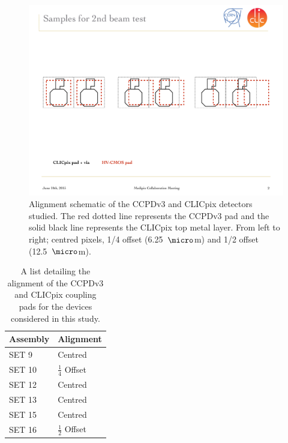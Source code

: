 \begin{figure}[h!]
\centering
\includegraphics[width=1.0\textwidth]{CLICdpVertex/Plots/misalignedPads.pdf}
\caption[Alignment schematic of the CCPDv3 and CLICpix detectors studied.  The red dotted line represents the CCPDv3 pad and the solid black line represents the CLICpix top metal layer.  From left to right; centred pixels, 1/4 offset (6.25~${\micro}$m) and 1/2 offset (12.5~${\micro}$m).]{Alignment schematic of the CCPDv3 and CLICpix detectors studied.  The red dotted line represents the CCPDv3 pad and the solid black line represents the CLICpix top metal layer.  From left to right; centred pixels, 1/4 offset (6.25~${\micro}$m) and 1/2 offset (12.5~${\micro}$m).}
\label{fig:alignment}
\end{figure}

\begin{table}[h!]
\centering
\begin{tabular}{ l l }
\hline
Assembly & Alignment \\ 
\hline
SET 9 & Centred \\
SET 10 & $\frac{1}{4}$ Offset \\
SET 12 & Centred \\
SET 13 & Centred \\
SET 15 & Centred \\
SET 16 & $\frac{1}{2}$ Offset \\
\hline
\end{tabular}
\caption[A list detailing the alignment of the CCPDv3 and CLICpix coupling pads for the devices considered in this study.]{A list detailing the alignment of the CCPDv3 and CLICpix coupling pads for the devices considered in this study.}
\label{table:alignment}
\end{table}

